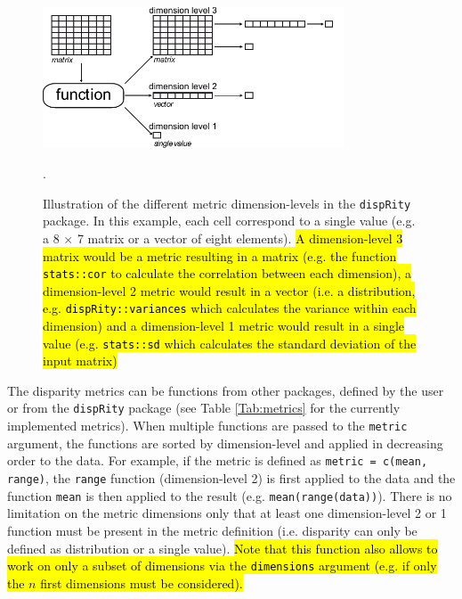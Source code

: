 \documentclass[12pt,letterpaper]{article}
\newcommand{\disp}{\texttt{dispRity} }
\begin{document}
\begin{figure}[!htbp]
\centering
   \includegraphics[width=0.8\textwidth]{../inst/gitbook/dispRity_fun.pdf} 
\caption{Illustration of the different metric dimension-levels in the \disp package. In this example, each cell correspond to a single value (e.g. a 8 $\times$ 7 matrix or a vector of eight elements).
\hl{A dimension-level 3 matrix would be a metric resulting in a matrix (e.g. the function \texttt{stats::cor} to calculate the correlation between each dimension), a dimension-level 2 metric would result in a vector (i.e. a distribution, e.g. \texttt{dispRity::variances} which calculates the variance within each dimension) and a dimension-level 1 metric would result in a single value (e.g. \texttt{stats::sd} which calculates the standard deviation of the input matrix)}}.
\label{Fig:levels}
\end{figure}

The disparity metrics can be functions from other packages, defined by the user or from the \disp package (see Table \ref{Tab:metrics} for the currently implemented metrics).
When multiple functions are passed to the \texttt{metric} argument, the functions are sorted by dimension-level and applied in decreasing order to the data.
For example, if the metric is defined as \texttt{metric = c(mean, range)}, the \texttt{range} function (dimension-level 2) is first applied to the data and the function \texttt{mean} is then applied to the result (e.g. \texttt{mean(range(data))}).
There is no limitation on the metric dimensions only that at least one dimension-level 2 or 1 function must be present in the metric definition (i.e. disparity can only be defined as distribution or a single value).
\hl{Note that this function also allows to work on only a subset of dimensions via the \texttt{dimensions} argument (e.g. if only the $n$ first dimensions must be considered).}
\end{document}
